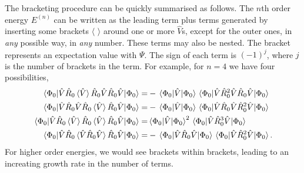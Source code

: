 The bracketing procedure can be quickly summarised as follows. The $n$th order 
energy $E^{(n)}$ can be written as the leading term plus terms generated by inserting 
some brackets $\langle$ $\rangle$ around one or more $\hat{V}$s, except for the outer 
ones, in \emph{any} possible way, in \emph{any} number. These terms may also be nested.
The bracket represents an expectation value with $\Psi$. The sign of each term is 
$(-1)^j$, where $j$ is the number of brackets in the term. 
For example, for $n=4$ we have four possibilities,
\begin{align}
    \mel{\Phi_0}{\hat{V}\hat{R}_0\ev*{\hat{V}}\hat{R}_0\hat{V}\hat{R}_0\hat{V}}{\Phi_0}
        =& - \mel{\Phi_0}{\hat{V}}{\Phi_0}
            \mel{\Phi_0}{\hat{V}\hat{R}_0^2\hat{V}\hat{R}_0\hat{V}}{\Phi_0} \\
    \mel{\Phi_0}{\hat{V}\hat{R}_0\hat{V}\hat{R}_0\ev*{\hat{V}}\hat{R}_0\hat{V}}{\Phi_0}
        =& - \mel{\Phi_0}{\hat{V}}{\Phi_0}
            \mel{\Phi_0}{\hat{V}\hat{R}_0\hat{V}\hat{R}_0^2\hat{V}}{\Phi_0} \\
    \mel{\Phi_0}{\hat{V}\hat{R}_0\ev*{\hat{V}}\hat{R}_0\ev*{\hat{V}}\hat{R}_0\hat{V}}{\Phi_0}
        =&  \mel{\Phi_0}{\hat{V}}{\Phi_0}^2
            \mel{\Phi_0}{\hat{V}\hat{R}_0^3\hat{V}}{\Phi_0} \\
    \mel{\Phi_0}{\hat{V}\hat{R}_0\ev*{\hat{V}\hat{R}_0\hat{V}}\hat{R}_0\hat{V}}{\Phi_0}
        =& - \mel{\Phi_0}{\hat{V}\hat{R}_0\hat{V}}{\Phi_0}
            \mel{\Phi_0}{\hat{V}\hat{R}_0^2\hat{V}}{\Phi_0}.
\end{align}
For higher order energies, we would see brackets within brackets, leading to an increating 
growth rate in the number of terms.
